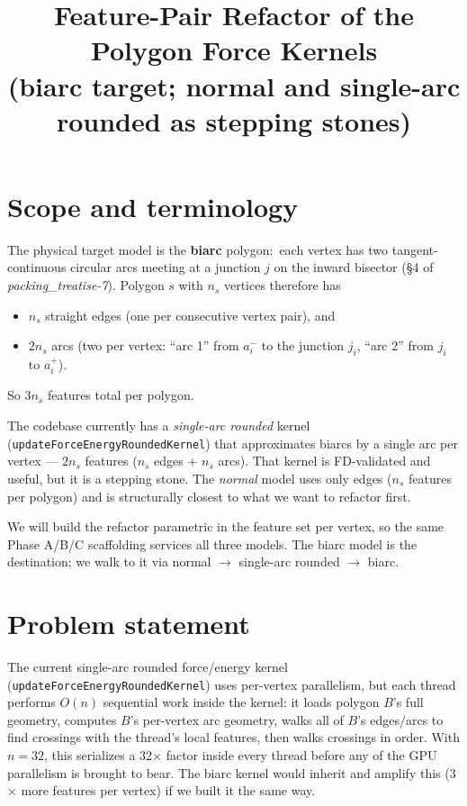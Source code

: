 \documentclass[11pt]{article}
\title{Feature-Pair Refactor of the Polygon Force Kernels\\
  \large (biarc target; normal and single-arc rounded as stepping stones)}
\author{}
\date{}
\newcommand{\code}[1]{\texttt{#1}}
\begin{document}
\maketitle

\section{Scope and terminology}

The physical target model is the \textbf{biarc} polygon:\ each vertex
has two tangent-continuous circular arcs meeting at a junction $j$ on
the inward bisector (\S 4 of \emph{packing\_treatise-7}). Polygon $s$
with $n_s$ vertices therefore has
\begin{itemize}[leftmargin=*]
  \item $n_s$ straight edges (one per consecutive vertex pair), and
  \item $2 n_s$ arcs (two per vertex: ``arc 1'' from $a_i^-$ to the
        junction $j_i$, ``arc 2'' from $j_i$ to $a_i^+$).
\end{itemize}
So $3 n_s$ features total per polygon.

The codebase currently has a \emph{single-arc rounded} kernel
(\code{updateForceEnergyRoundedKernel}) that approximates biarcs by a
single arc per vertex --- $2 n_s$ features ($n_s$ edges + $n_s$ arcs).
That kernel is FD-validated and useful, but it is a stepping stone.
The \emph{normal} model uses only edges ($n_s$ features per polygon)
and is structurally closest to what we want to refactor first.

We will build the refactor parametric in the feature set per vertex,
so the same Phase A/B/C scaffolding services all three models. The
biarc model is the destination; we walk to it via normal $\to$
single-arc rounded $\to$ biarc.

\section{Problem statement}

The current single-arc rounded force/energy kernel
(\code{updateForceEnergyRoundedKernel}) uses per-vertex parallelism, but
each thread performs $O(n)$ sequential work inside the kernel: it loads
polygon $B$'s full geometry, computes $B$'s per-vertex arc geometry,
walks all of $B$'s edges/arcs to find crossings with the thread's local
features, then walks crossings in order. With $n=32$, this serializes a
32$\times$ factor inside every thread before any of the GPU
parallelism is brought to bear. The biarc kernel would inherit and
amplify this (3$\times$ more features per vertex) if we built it the
same way.
\end{document}
